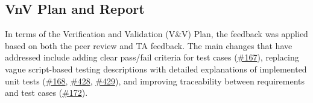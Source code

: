 \documentclass{article}
\begin{document}
\subsection{VnV Plan and Report}
 
In terms of the Verification and Validation (V\&V) Plan, the feedback was applied based on both the peer review and TA feedback. The main changes that have addressed include adding clear pass/fail criteria for test cases (\href{https://github.com/M9Huynh/technically-functional/issues/167}{\#167}), replacing vague script-based testing descriptions with detailed explanations of implemented unit tests (\href{https://github.com/M9Huynh/technically-functional/issues/168}{\#168}, \href{https://github.com/M9Huynh/technically-functional/issues/428}{\#428}, \href{https://github.com/M9Huynh/technically-functional/issues/429}{\#429}), and improving traceability between requirements and test cases (\href{https://github.com/M9Huynh/technically-functional/issues/172}{\#172}).
 
\end{document}
